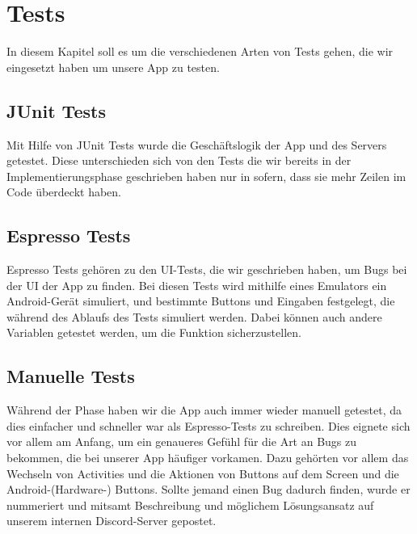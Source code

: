 
\section{Tests}

    In diesem Kapitel soll es um die verschiedenen Arten von Tests gehen, die wir eingesetzt haben um unsere App zu testen.

    \subsection{JUnit Tests}

        Mit Hilfe von JUnit Tests wurde die Geschäftslogik der App und des Servers getestet. Diese unterschieden sich von den Tests die wir bereits in der Implementierungsphase geschrieben haben nur in sofern, dass sie mehr Zeilen im Code überdeckt haben.

    \subsection{Espresso Tests}

        Espresso Tests gehören zu den UI-Tests, die wir geschrieben haben, um Bugs bei der UI der App zu finden. Bei diesen Tests wird mithilfe eines Emulators ein Android-Gerät simuliert, und bestimmte Buttons und Eingaben festgelegt, die während des Ablaufs des Tests simuliert werden.
        Dabei können auch andere Variablen getestet werden, um die Funktion sicherzustellen.

    \subsection{Manuelle Tests}

        Während der Phase haben wir die App auch immer wieder manuell getestet, da dies einfacher und schneller war als Espresso-Tests zu schreiben. Dies eignete sich vor allem am Anfang, um ein genaueres Gefühl für die Art an Bugs zu bekommen, die bei unserer App häufiger vorkamen.
        Dazu gehörten vor allem das Wechseln von Activities und die Aktionen von Buttons auf dem Screen und die Android-(Hardware-) Buttons.
        Sollte jemand einen Bug dadurch finden, wurde er nummeriert und mitsamt Beschreibung und möglichem Lösungsansatz auf unserem internen Discord-Server gepostet.
